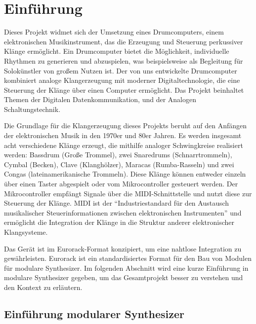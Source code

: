 \section{Einführung}

Dieses Projekt widmet sich der Umsetzung eines Drumcomputers, einem elektronischen Musikinstrument, das die Erzeugung und Steuerung perkussiver Klänge ermöglicht. Ein Drumcomputer bietet die Möglichkeit, individuelle Rhythmen zu generieren und abzuspielen, was beispielsweise als Begleitung für Solokünstler von großem Nutzen ist. Der von uns entwickelte Drumcomputer kombiniert analoge Klangerzeugung mit moderner Digitaltechnologie, die eine Steuerung der Klänge über einen Computer ermöglicht. Das Projekt beinhaltet Themen der Digitalen Datenkommunikation, und der Analogen Schaltungstechnik.

Die Grundlage für die Klangerzeugung dieses Projekts beruht auf den Anfängen der elektronischen Musik in den 1970er und 80er Jahren. Es werden insgesamt acht verschiedene Klänge erzeugt, die mithilfe analoger Schwingkreise realisiert werden: Bassdrum (Große Trommel), zwei Snaredrums (Schnarrtrommeln), Cymbal (Becken), Clave (Klanghölzer), Maracas (Rumba-Rasseln) und zwei Congas (lateinamerikanische Trommeln). Diese Klänge können entweder einzeln über einen Taster abgespielt oder vom Mikrocontroller gesteuert werden. Der Mikrocontroller empfängt Signale über die MIDI-Schnittstelle und nutzt diese zur Steuerung der Klänge. MIDI ist der \enquote{Industriestandard für den Austausch musikalischer Steuerinformationen zwischen elektronischen Instrumenten} \cite{wiki_midi} und ermöglicht die Integration der Klänge in die Struktur anderer elektronischer Klangsysteme.

Das Gerät ist im Eurorack-Format konzipiert, um eine nahtlose Integration zu gewährleisten. Eurorack ist ein standardisiertes Format für den Bau von Modulen für modulare Synthesizer. Im folgenden Abschnitt wird eine kurze Einführung in modulare Synthesizer gegeben, um das Gesamtprojekt besser zu verstehen und den Kontext zu erläutern.

\subsection{Einführung modularer Synthesizer}


